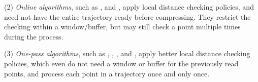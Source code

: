 \sstab (2) {\em Online algorithms}, such as \opwa \cite{Meratnia:Spatiotemporal}, \squishe \cite{Muckell:SQUISH} and \bqsa \cite{Liu:BQS}, apply local distance checking policies, and need not have the entire trajectory ready before compressing. They restrict the checking within a window/buffer, but may still check a point  multiple times during the process.

\sstab (3) {\em One-pass algorithms}, such as \operb\cite{Lin:Operb}, \siped \cite{Williams:Longest,Sklansky:Cone,Dunham:Cone, Zhao:Sleeve}, \cised \cite{Lin:Cised}, \intersec\cite{Long:Direction} and \interval \cite{Ke:Interval}, apply better local distance checking policies, which even do not need a window or buffer for the previously read points, and process each point in a trajectory once and only once.




